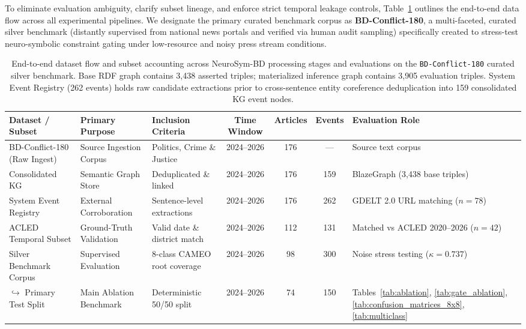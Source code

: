 \documentclass[11pt,a4paper]{article}
\begin{document}
To eliminate evaluation ambiguity, clarify subset lineage, and enforce strict temporal leakage controls, Table~\ref{tab:dataset_lineage} outlines the end-to-end data flow across all experimental pipelines. We designate the primary curated benchmark corpus as \textbf{BD-Conflict-180}, a multi-faceted, curated silver benchmark (distantly supervised from national news portals and verified via human audit sampling) specifically created to stress-test neuro-symbolic constraint gating under low-resource and noisy press stream conditions.

\begin{table}[t]
\centering
\small
\caption{End-to-end dataset flow and subset accounting across NeuroSym-BD processing stages and evaluations on the \texttt{BD-Conflict-180} curated silver benchmark. Base RDF graph contains 3,438 asserted triples; materialized inference graph contains 3,905 evaluation triples. System Event Registry (262 events) holds raw candidate extractions prior to cross-sentence entity coreference deduplication into 159 consolidated KG event nodes.}
\label{tab:dataset_lineage}
\begin{tabular}{lp{3.6cm}p{3.2cm}cccp{3.5cm}}
\toprule
\textbf{Dataset / Subset} & \textbf{Primary Purpose} & \textbf{Inclusion Criteria} & \textbf{Time Window} & \textbf{Articles} & \textbf{Events} & \textbf{Evaluation Role} \\
\midrule
BD-Conflict-180 (Raw Ingest)  & Source Ingestion Corpus  & Politics, Crime \& Justice   & 2024--2026           & 176               & ---             & Source text corpus \\
Consolidated KG           & Semantic Graph Store     & Deduplicated \& linked       & 2024--2026           & 176               & 159             & BlazeGraph (3,438 base triples) \\
System Event Registry     & External Corroboration   & Sentence-level extractions   & 2024--2026           & 176               & 262             & GDELT 2.0 URL matching ($n=78$) \\
ACLED Temporal Subset     & Ground-Truth Validation  & Valid date \& district match & 2024--2026           & 112               & 131             & Matched vs ACLED 2020--2026 ($n=42$) \\
Silver Benchmark Corpus   & Supervised Evaluation    & 8-class CAMEO root coverage  & 2024--2026           & 98                & 300             & Noise stress testing ($\kappa=0.737$) \\
\quad $\hookrightarrow$ Primary Test Split & Main Ablation Benchmark  & Deterministic 50/50 split    & 2024--2026           & 74                & 150             & Tables~\ref{tab:ablation}, \ref{tab:gate_ablation}, \ref{tab:confusion_matrices_8x8}, \ref{tab:multiclass} \\

\end{tabular}
\end{table}
\end{document}
